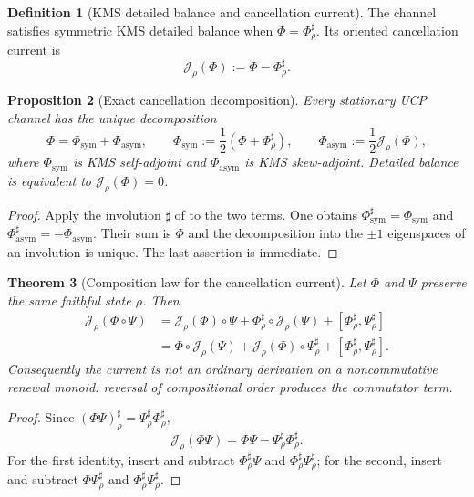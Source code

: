 \documentclass[11pt]{article}
\newtheorem{theorem}{Theorem}[section]
\newtheorem{proposition}[theorem]{Proposition}
\theoremstyle{definition}
\newtheorem{definition}[theorem]{Definition}
\theoremstyle{remark}
\begin{document}
\begin{definition}[KMS detailed balance and cancellation current]
\label{def:detailed-balance}
The channel satisfies symmetric KMS detailed balance when
$\Phi=\Phi_\rho^\sharp$.  Its oriented cancellation current is
\[
 \mathcal J_\rho(\Phi):=\Phi-\Phi_\rho^\sharp.
\]
\end{definition}

\begin{proposition}[Exact cancellation decomposition]
\label{prop:cancellation}
Every stationary UCP channel has the unique decomposition
\[
 \Phi=\Phi_{\mathrm{sym}}+\Phi_{\mathrm{asym}},
 \qquad
 \Phi_{\mathrm{sym}}:=\frac12(\Phi+\Phi_\rho^\sharp),
 \qquad
 \Phi_{\mathrm{asym}}:=\frac12\mathcal J_\rho(\Phi),
\]
where $\Phi_{\mathrm{sym}}$ is KMS self-adjoint and
$\Phi_{\mathrm{asym}}$ is KMS skew-adjoint.  Detailed balance is equivalent to
$\mathcal J_\rho(\Phi)=0$.
\end{proposition}

\begin{proof}
Apply the involution $\sharp$ of  to the two terms.
One obtains $\Phi_{\mathrm{sym}}^\sharp=\Phi_{\mathrm{sym}}$ and
$\Phi_{\mathrm{asym}}^\sharp=-\Phi_{\mathrm{asym}}$.  Their sum is $\Phi$ and
the decomposition into the $\pm1$ eigenspaces of an involution is unique.
The last assertion is immediate.
\end{proof}

\begin{theorem}[Composition law for the cancellation current]
\label{thm:current-composition}
Let $\Phi$ and $\Psi$ preserve the same faithful state $\rho$.  Then
\[
\boxed{
\begin{aligned}
 \mathcal J_\rho(\Phi\circ\Psi)
 &=\mathcal J_\rho(\Phi)\circ\Psi
   +\Phi_\rho^\sharp\circ\mathcal J_\rho(\Psi)
   +[\Phi_\rho^\sharp,\Psi_\rho^\sharp]\\
 &=\Phi\circ\mathcal J_\rho(\Psi)
   +\mathcal J_\rho(\Phi)\circ\Psi_\rho^\sharp
   +[\Phi_\rho^\sharp,\Psi_\rho^\sharp].
\end{aligned}}
\]
Consequently the current is not an ordinary derivation on a noncommutative
renewal monoid: reversal of compositional order produces the commutator term.
\end{theorem}

\begin{proof}
Since $(\Phi\Psi)_\rho^\sharp=\Psi_\rho^\sharp\Phi_\rho^\sharp$,
\[
 \mathcal J_\rho(\Phi\Psi)
 =\Phi\Psi-\Psi_\rho^\sharp\Phi_\rho^\sharp.
\]
For the first identity, insert and subtract
$\Phi_\rho^\sharp\Psi$ and
$\Phi_\rho^\sharp\Psi_\rho^\sharp$; for the second, insert and subtract
$\Phi\Psi_\rho^\sharp$ and
$\Phi_\rho^\sharp\Psi_\rho^\sharp$.
\end{proof}
\end{document}
